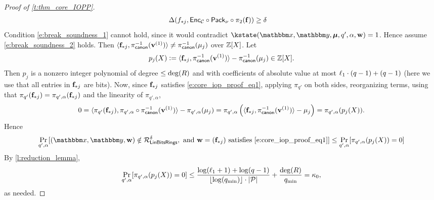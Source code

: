 \documentclass[11pt,letterpaper,usenames,dvipsnames]{article}
\begin{document}
\begin{proof}[Proof of \cref{t:thm_core_IOPP}]
\begin{align}
    &\Delta(f_{*j},\mathsf{Enc}_{\mathcal{C}}\circ\mathsf{Pack}_\nu\circ \pi_2(\mathbf{f}))\geq \delta \label{e:break_soundness_1}
\end{align}
%
Condition \eqref{e:break_soundness_1} cannot hold, since it would contradict $\kstate(\inp,\oracle, \bm{\mu},q',\alpha,\ww)=1$. 
%
Hence assume \eqref{e:break_soundness_2} holds. Then $\langle \mathbf{f}_{*j}, \pi_{\mathsf{canon}}^{-1}(\mathbf{v}^{(1)}) \rangle\neq \pi_{\mathsf{canon}}^{-1}(\mu_j)$ over $\mathbb{Z}[X]$. Let $$p_j(X){\;\vcentcolon=\;}  \langle \mathbf{f}_{*j}, \pi_{\mathsf{canon}}^{-1}(\mathbf{v}^{(1)}) \rangle- \pi_{\mathsf{canon}}^{-1}(\mu_j) \in \mathbb{Z}[X].
$$
Then $p_j$ is a nonzero integer polynomial of degree $\leq \deg(R)$ and with coefficients of absolute value at most $\ell_1\cdot (q-1) + (q-1)$ (here we use that all entries in $\mathbf{f}_{*j}$ are bits). Now, since $\mathbf{f}_{*j}$ satisfies \eqref{e:core_iop_proof_eq1}, applying $\pi_{q'}$ on both sides, reorganizing terms,  using that $\pi_{q'}(\mathbf{f}_{*j})=\pi_{q',\alpha}(\mathbf{f}_{*j})$ and the linearity of $\pi_{q', \alpha}$,
%
$$
0=\langle \pi_{q'}(\mathbf{f}_{*j}), \pi_{q',\alpha}\circ \pi_{\mathsf{canon}}^{-1}(\mathbf{v}^{(1)})\rangle -\pi_{q',\alpha}(\mu_j) = \pi_{q', \alpha}\left(\langle \mathbf{f}_{*j}, \pi_{\mathsf{canon}}^{-1}(\mathbf{v}^{(1)})\rangle -\mu_j\right) = \pi_{q', \alpha}(p_j(X)). 
$$
%
Hence 
%
$$
\Pr_{q',\alpha}[(\inp,\oracle,\ww)\notin \LinBitsDual^\delta, \text{ and }\ww=(\bff_{*j}) \text{ satisfies  \eqref{e:core_iop_proof_eq1}}] \leq \Pr_{q',\alpha}[\pi_{q',\alpha}(p_j(X))=0] 
$$
%
By \cref{l:reduction_lemma},
%
$$
\Pr_{q',\alpha}[\pi_{q',\alpha}(p_j(X))=0] \leq \frac{\log(\ell_1+1) + \log(q-1)}{\lfloor\log(q_{\min})\rfloor\cdot |\mathcal{P}|} + \frac{\deg(R)}{q_{\min}} = \kappa_0,
$$
as needed.


\end{proof}
\end{document}
